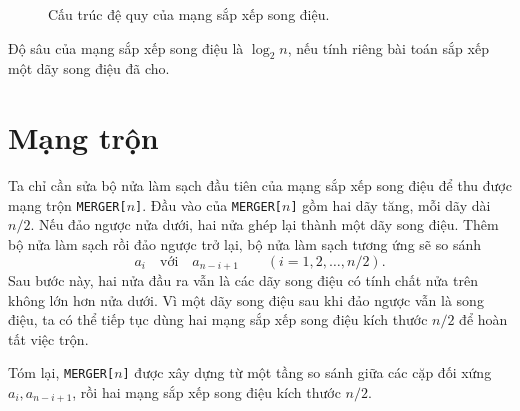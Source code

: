 \documentclass[11pt]{article}
\begin{document}
\begin{figure}[ht]
\centering
{}
\caption{Cấu trúc đệ quy của mạng sắp xếp song điệu.}
\end{figure}

Độ sâu của mạng sắp xếp song điệu là $\log_2 n$, nếu tính riêng bài toán sắp
xếp một dãy song điệu đã cho.

\section{Mạng trộn}

Ta chỉ cần sửa bộ nửa làm sạch đầu tiên của mạng sắp xếp song điệu để thu được
mạng trộn \texttt{MERGER[$n$]}. Đầu vào của \texttt{MERGER[$n$]} gồm hai dãy
tăng, mỗi dãy dài $n/2$. Nếu đảo ngược nửa dưới, hai nửa ghép lại thành một
dãy song điệu. Thêm bộ nửa làm sạch rồi đảo ngược trở lại, bộ nửa làm sạch
tương ứng sẽ so sánh
\[
  a_i\quad\text{với}\quad a_{n-i+1}
  \qquad (i=1,2,\ldots,n/2).
\]
Sau bước này, hai nửa đầu ra vẫn là các dãy song điệu có tính chất nửa trên
không lớn hơn nửa dưới. Vì một dãy song điệu sau khi đảo ngược vẫn là song
điệu, ta có thể tiếp tục dùng hai mạng sắp xếp song điệu kích thước $n/2$ để
hoàn tất việc trộn.

Tóm lại, \texttt{MERGER[$n$]} được xây dựng từ một tầng so sánh giữa các cặp
đối xứng $a_i,a_{n-i+1}$, rồi hai mạng sắp xếp song điệu kích thước $n/2$.
\end{document}
